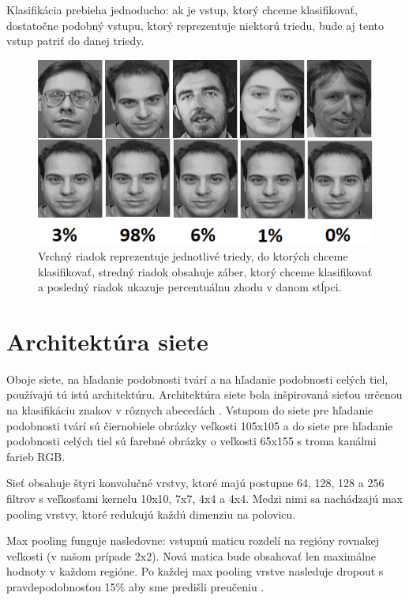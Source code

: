 Klasifikácia prebieha jednoducho: ak je vstup, ktorý chceme klasifikovať, dostatočne podobný vstupu, ktorý reprezentuje niektorú triedu, bude aj tento vstup patriť do danej triedy.

\begin{figure}[H]
\centerline{\includegraphics[width=1\textwidth]{images/oneshot_classification}}
\caption[Klasifikácia pomocou siamskej neurónovej siete]{Vrchný riadok reprezentuje jednotlivé triedy, do ktorých chceme klasifikovať, stredný riadok obsahuje záber, ktorý chceme klasifikovať a posledný riadok ukazuje percentuálnu zhodu v danom stĺpci.}
\label{obr:oneshot_classification}
\end{figure}

\section{Architektúra siete} \label{kap:siamese_architecture}
Oboje siete, na hľadanie podobnosti tvárí a na hľadanie podobnosti celých tiel, používajú tú istú architektúru.
Architektúra siete bola inšpirovaná sieťou určenou na klasifikáciu znakov v rôznych abecedách \cite{siamese_architecture}.
Vstupom do siete pre hľadanie podobnosti tvárí sú čiernobiele obrázky veľkosti 105x105 a 
do siete pre hľadanie podobnosti celých tiel sú farebné obrázky o veľkosti 65x155 s troma kanálmi farieb RGB.

Sieť obsahuje štyri konvolučné vrstvy, ktoré majú postupne 64, 128, 128 a 256 filtrov s veľkosťami kernelu 10x10, 7x7, 4x4 a 4x4.
Medzi nimi sa nachádzajú max pooling vrstvy, ktoré redukujú každú dimenziu na polovicu.

Max pooling funguje nasledovne: vstupnú maticu rozdelí na regióny rovnakej veľkosti (v našom prípade 2x2). 
Nová matica bude obsahovať len maximálne hodnoty v každom regióne.
Po každej max pooling vrstve nasleduje dropout s pravdepodobnosťou 15\% aby sme predišli preučeniu \cite{JMLR:v15:srivastava14a}. 

